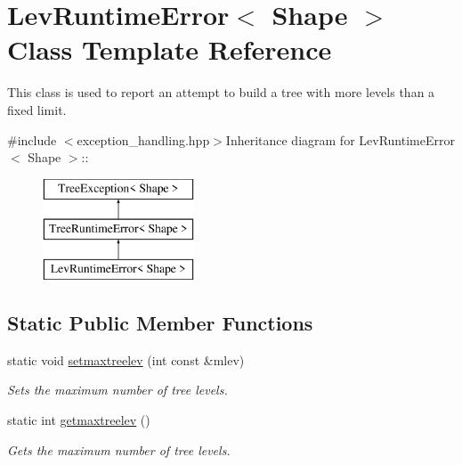 \hypertarget{classLevRuntimeError}{
\section{LevRuntimeError$<$ Shape $>$ Class Template Reference}
\label{classLevRuntimeError}
}


This class is used to report an attempt to build a tree with more levels than a fixed limit.  


{\ttfamily \#include $<$exception\_\-handling.hpp$>$}Inheritance diagram for LevRuntimeError$<$ Shape $>$::\begin{figure}[H]
\begin{center}
\leavevmode
\includegraphics[height=3cm]{classLevRuntimeError}
\end{center}
\end{figure}
\subsection*{Static Public Member Functions}
\begin{DoxyCompactItemize}
\item 
\hypertarget{classLevRuntimeError_a9b99f52a1fabe68b2abf6e59cc07d516}{
static void \hyperlink{classLevRuntimeError_a9b99f52a1fabe68b2abf6e59cc07d516}{setmaxtreelev} (int const \&mlev)}
\label{classLevRuntimeError_a9b99f52a1fabe68b2abf6e59cc07d516}

\begin{DoxyCompactList}\small\item\em Sets the maximum number of tree levels. \item\end{DoxyCompactList}\item 
\hypertarget{classLevRuntimeError_a47cd6be3db2365778750b7e70d37b4a5}{
static int \hyperlink{classLevRuntimeError_a47cd6be3db2365778750b7e70d37b4a5}{getmaxtreelev} ()}
\label{classLevRuntimeError_a47cd6be3db2365778750b7e70d37b4a5}

\begin{DoxyCompactList}\small\item\em Gets the maximum number of tree levels. \item\end{DoxyCompactList}\end{DoxyCompactItemize}
